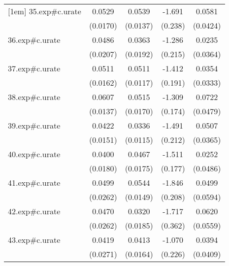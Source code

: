 {\begin{tabular}{l*{4}{c}}
[1em]
35.exp#c.urate&      0.0529\sym{**} &      0.0539\sym{***}&      -1.691\sym{***}&      0.0581         \\
            &    (0.0170)         &    (0.0137)         &     (0.238)         &    (0.0424)         \\
[1em]
36.exp#c.urate&      0.0486\sym{*}  &      0.0363         &      -1.286\sym{***}&      0.0235         \\
            &    (0.0207)         &    (0.0192)         &     (0.215)         &    (0.0364)         \\
[1em]
37.exp#c.urate&      0.0511\sym{**} &      0.0511\sym{***}&      -1.412\sym{***}&      0.0354         \\
            &    (0.0162)         &    (0.0117)         &     (0.191)         &    (0.0333)         \\
[1em]
38.exp#c.urate&      0.0607\sym{***}&      0.0515\sym{**} &      -1.309\sym{***}&      0.0722         \\
            &    (0.0137)         &    (0.0170)         &     (0.174)         &    (0.0479)         \\
[1em]
39.exp#c.urate&      0.0422\sym{**} &      0.0336\sym{**} &      -1.491\sym{***}&      0.0507         \\
            &    (0.0151)         &    (0.0115)         &     (0.212)         &    (0.0365)         \\
[1em]
40.exp#c.urate&      0.0400\sym{*}  &      0.0467\sym{*}  &      -1.511\sym{***}&      0.0252         \\
            &    (0.0180)         &    (0.0175)         &     (0.177)         &    (0.0486)         \\
[1em]
41.exp#c.urate&      0.0499         &      0.0544\sym{***}&      -1.846\sym{***}&      0.0499         \\
            &    (0.0262)         &    (0.0149)         &     (0.208)         &    (0.0594)         \\
[1em]
42.exp#c.urate&      0.0470         &      0.0320         &      -1.717\sym{***}&      0.0620         \\
            &    (0.0262)         &    (0.0185)         &     (0.362)         &    (0.0559)         \\
[1em]
43.exp#c.urate&      0.0419         &      0.0413\sym{*}  &      -1.070\sym{***}&      0.0394         \\
            &    (0.0271)         &    (0.0164)         &     (0.226)         &    (0.0409)         \\

\end{tabular}}
